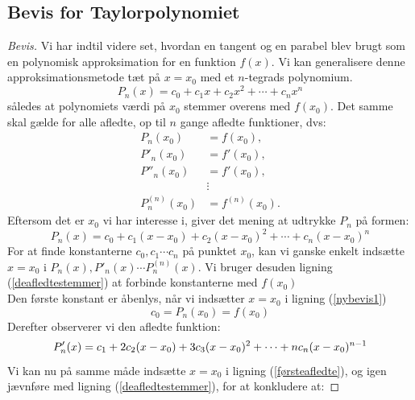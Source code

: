 \documentclass[12pt, a4paper]{article}
\begin{document}
\begin{refsection}
\subsection{Bevis for Taylorpolynomiet}
\begin{proof}[Bevis]
    
Vi har indtil videre set, hvordan en tangent og en parabel blev brugt som en polynomisk approksimation for en funktion $f(x)$. Vi kan generalisere denne approksimationsmetode tæt på $x=x_0$ med et  $n$-tegrads polynomium.\\
\[
P_n(x)=c_0+c_1x+c_2x^2+ \cdots +c_nx^n
\] 
således at polynomiets værdi på $x_0$ stemmer overens med  $f(x_0)$. Det samme skal gælde for alle afledte, op til $n$ gange afledte funktioner, dvs:
 \begin{equation}\label{deafledtestemmer}
     \begin{aligned}
         P_n(x_0)&=f(x_0),\\
         P'_n(x_0)&=f'(x_0),\\
         P''_n(x_0)&=f'(x_0),\\
                   &\vdots\\
         P^{(n)}_n(x_0)&=f^{(n)}(x_0).
     \end{aligned}
\end{equation}
Eftersom det er $x_0$ vi har interesse i, giver det mening at udtrykke  $P_n$ på formen:
\begin{equation}\label{nybevis1}
   P_n(x)=c_0+c_1(x-x_0)+c_2(x-x_0)^2+\cdots+c_n(x-x_0)^n 
\end{equation}
For at finde konstanterne $c_0, c_1 \cdots c_n$ på punktet $x_0$, kan vi ganske enkelt indsætte $x=x_0$ i $P_n(x), P'_n(x) \cdots P^{(n)}_n(x)$. Vi bruger desuden ligning (\ref{deafledtestemmer}) at forbinde konstanterne med $f(x_0)$\\
Den første konstant er åbenlys, når vi indsætter $x=x_0$ i ligning (\ref{nybevis1})
 \begin{equation*}
    c_0=P_n(x_0)=f(x_0)
\end{equation*}
Derefter observerer vi den afledte funktion: 
\begin{equation}\label{førsteafledte}
        P'_n(x)=c_1+2c_2(x-x_0)+3c_3(x-x_0)^2+\cdots+nc_n(x-x_0)^{n-1}\\
\end{equation}
Vi kan nu på samme måde indsætte $x=x_0$ i ligning (\ref{førsteafledte}), og igen jævnføre med ligning (\ref{deafledtestemmer}), for at konkludere at:

\end{proof}
\end{refsection}
\end{document}
